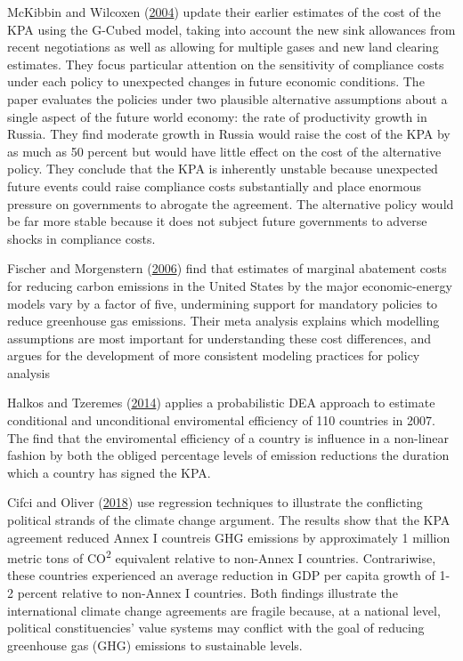\documentclass[
  12pt,
]{article}
\begin{document}
McKibbin and Wilcoxen (\protect\hyperlink{ref-McKibbin2004}{2004}) update their earlier estimates of the cost of the KPA using the G-Cubed model, taking into account the new sink allowances from recent negotiations as well as allowing for multiple gases and new land clearing estimates. They focus particular attention on the sensitivity of compliance costs under each policy to unexpected changes in future economic conditions. The paper evaluates the policies under two plausible alternative assumptions about a single aspect of the future world economy: the rate of productivity growth in Russia. They find moderate growth in Russia would raise the cost of the KPA by as much as 50 percent but would have little effect on the cost of the alternative policy. They conclude that the KPA is inherently unstable because unexpected future events could raise compliance costs substantially and place enormous pressure on governments to abrogate the agreement. The alternative policy would be far more stable because it does not subject future governments to adverse shocks in compliance costs.

Fischer and Morgenstern (\protect\hyperlink{ref-Fischer2006}{2006}) find that estimates of marginal abatement costs for reducing carbon emissions in the United States by the major economic-energy models vary by a factor of five, undermining support for mandatory policies to reduce greenhouse gas emissions. Their meta analysis explains which modelling assumptions are most important for understanding these cost differences, and argues for the development of more consistent modeling practices for policy analysis

Halkos and Tzeremes (\protect\hyperlink{ref-Halkos2014}{2014}) applies a probabilistic DEA approach to estimate conditional and unconditional enviromental efficiency of 110 countries in 2007. The find that the enviromental efficiency of a country is influence in a non-linear fashion by both the obliged percentage levels of emission reductions the duration which a country has signed the KPA.

Cifci and Oliver (\protect\hyperlink{ref-Cifci2018}{2018}) use regression techniques to illustrate the conflicting political strands of the climate change argument. The results show that the KPA agreement reduced Annex I countreis GHG emissions by approximately 1 million metric tons of CO\textsuperscript{2} equivalent relative to non-Annex I countries. Contrariwise, these countries experienced an average reduction in GDP per capita growth of 1-2 percent relative to non-Annex I countries. Both findings illustrate the international climate change agreements are fragile because, at a national level, political constituencies' value systems may conflict with the goal of reducing greenhouse gas (GHG) emissions to sustainable levels.
\end{document}
